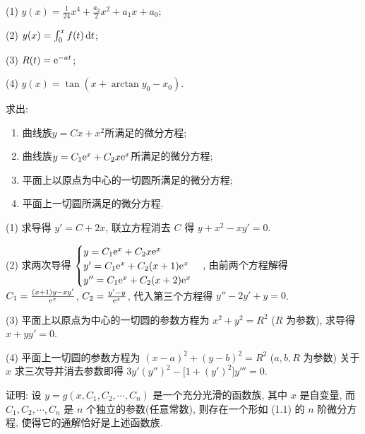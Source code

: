 \begin{solve}
  (1) $y(x)=\frac{1}{24}x^4+\frac{a_2}{2}x^2+a_1x+a_0$;

  (2) $y(x)=\int_0^xf(t)\mathop{}\!\mathrm{d} t$;

  (3) $R(t)=\mathrm{e}^{-at}$;

  (4) $y(x)=\tan(x+\arctan y_0-x_0)$.
\end{solve}



\begin{exercise}
  求出:
  \begin{enumerate}[(1)]
  \item 曲线族$y=Cx+x^2$所满足的微分方程;
  \item 曲线族$y=C_1\mathrm{e}^x+C_2x\mathrm{e}^x$所满足的微分方程;
  \item 平面上以原点为中心的一切圆所满足的微分方程;
  \item 平面上一切圆所满足的微分方程.
  \end{enumerate}
\end{exercise}

\begin{solve}
  (1) 求导得 $y'=C+2x$, 联立方程消去 $C$ 得 $y+x^2-xy'=0$.

  (2) 求两次导得
  $\begin{cases}y=C_1\mathrm{e}^x+C_2x\mathrm{e}^x\\y'=C_1\mathrm{e}^x+C_2(x+1)\mathrm{e}^x\\y''=C_1\mathrm{e}^x+C_2(x+2)\mathrm{e}^x\end{cases}$, 
  由前两个方程解得 $C_1=\frac{(x+1)y-xy'}{\mathrm{e}^x}$, $C_2=\frac{y'-y}{\mathrm{e}^x}$, 
  代入第三个方程得 $y''-2y'+y=0$.

  (3) 平面上以原点为中心的一切圆的参数方程为 $x^2+y^2=R^2$ ($R$ 为参数), 求导得 $x+yy'=0$.

  (4) 平面上一切圆的参数方程为 $(x-a)^2+(y-b)^2=R^2$ ($a,b,R$ 为参数)
  关于 $x$ 求三次导并消去参数即得 $3y'(y'')^2-\bigl[1+(y')^2\bigr]y'''=0$.
\end{solve}



\begin{exercise}
证明: 设 $y=g(x,C_1,C_2,\cdots,C_n)$ 是一个充分光滑的函数族, 其中 $x$ 是自变量, 
而 $C_1, C_2, \cdots, C_n$ 是 $n$ 个独立的参数(任意常数), 则存在一个形如 (1.1) 的 $n$ 阶微分方程, 
使得它的通解恰好是上述函数族.
\end{exercise}

